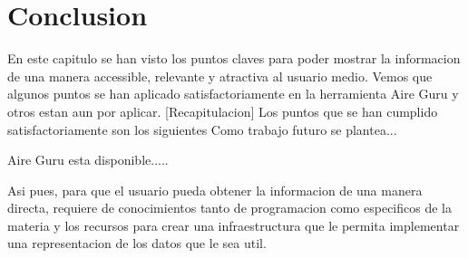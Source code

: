 \section{Conclusion}
En este capitulo se han visto los puntos claves para poder mostrar la informacion de una manera accessible,
relevante y atractiva al usuario medio. Vemos que algunos puntos se han aplicado satisfactoriamente en la herramienta
Aire Guru y otros estan aun por aplicar.
[Recapitulacion]
Los puntos que se han cumplido satisfactoriamente son los siguientes
Como trabajo futuro se plantea...
 

Aire Guru esta disponible.....



Asi pues, para que el usuario pueda obtener la informacion de una manera directa, requiere de conocimientos tanto 
de programacion como especificos de la materia y los recursos para crear una infraestructura que le permita implementar 
una representacion de los datos que le sea util.
